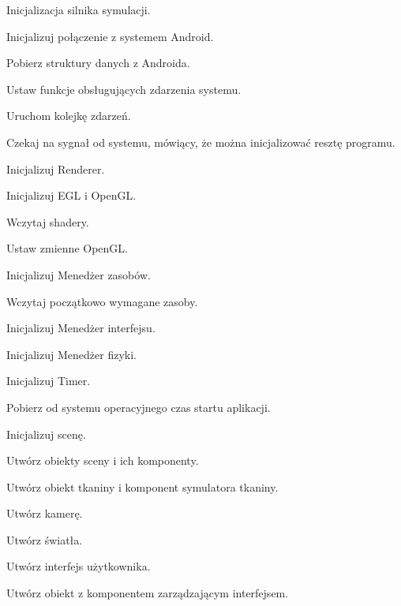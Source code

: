 	\begin{algorithm}
		\label{alg_4_1}
		\caption{Inicjalizacja silnika symulacji.}
			
				Inicjalizuj połączenie z systemem Android.
				
				\Indp
				
					Pobierz struktury danych z Androida.
					
					Ustaw funkcje obsługujących zdarzenia systemu.
					
					Uruchom kolejkę zdarzeń.
					
					Czekaj na sygnał od systemu, mówiący, że można inicjalizować resztę programu.
				
				\Indm
									
				Inicjalizuj Renderer.
				
				\Indp
				
					Inicjalizuj EGL i OpenGL.
					
					Wczytaj shadery.
					
					Ustaw zmienne OpenGL.
					
				\Indm	
				
				Inicjalizuj Menedżer zasobów.
				
				\Indp
					
					Wczytaj początkowo wymagane zasoby.
				
				\Indm	
				
				Inicjalizuj Menedżer interfejsu.
				
				Inicjalizuj Menedżer fizyki.
				
				Inicjalizuj Timer.
				
				\Indp
				
					Pobierz od systemu operacyjnego czas startu aplikacji.
				
				\Indm
				
				Inicjalizuj scenę.
				
				\Indp
				
					Utwórz obiekty sceny i ich komponenty.
					
					Utwórz obiekt tkaniny i komponent symulatora tkaniny.
					
					Utwórz kamerę.
					
					Utwórz światła.
					
					Utwórz interfejs użytkownika.
					
					Utwórz obiekt z komponentem zarządzającym interfejsem.
				
				\Indm			
	\end{algorithm}
	\newpage
	
